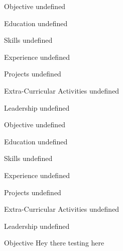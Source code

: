 \documentclass{resume}
\begin{document}
\begin{rSection}{Objective}
undefined
\end{rSection}

\begin{rSection}{Education}
undefined
\end{rSection}

\begin{rSection}{Skills}
undefined
\end{rSection}

\begin{rSection}{Experience}
undefined
\end{rSection}

\begin{rSection}{Projects}
undefined
\end{rSection}

\begin{rSection}{Extra-Curricular Activities}
undefined
\end{rSection}

\begin{rSection}{Leadership}
undefined
\end{rSection}

\begin{rSection}{Objective}
undefined
\end{rSection}

\begin{rSection}{Education}
undefined
\end{rSection}

\begin{rSection}{Skills}
undefined
\end{rSection}

\begin{rSection}{Experience}
undefined
\end{rSection}

\begin{rSection}{Projects}
undefined
\end{rSection}

\begin{rSection}{Extra-Curricular Activities}
undefined
\end{rSection}

\begin{rSection}{Leadership}
undefined
\end{rSection}

\begin{rSection}{Objective}
Hey there testing here
\end{rSection}
\end{document}
